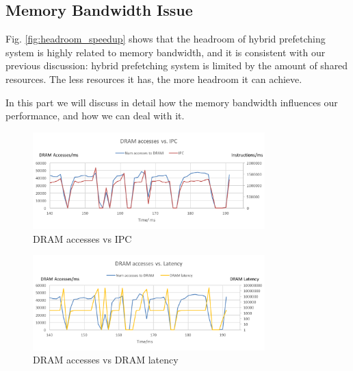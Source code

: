   \subsection{Memory Bandwidth Issue}

  \label{sec:memorybandwidthissue}
  Fig. \ref{fig:headroom_speedup} shows that the headroom of hybrid prefetching system is highly related to memory bandwidth, and it is consistent with our previous discussion: hybrid prefetching system is limited by the amount of shared resources. 
  The less resources it has, the more headroom it can achieve.\par
  In this part we will discuss in detail how the memory bandwidth influences our performance, and how we can deal with it.\par
  

    \begin{figure}[h]
	   \centering
	   \includegraphics[width=0.8\textwidth]{images/bandwidth_IPC.png}
	   \caption{DRAM accesses vs IPC}
	  \label{fig:bandwidth_IPC}
  \end{figure}
  \begin{figure}[h]
	   \centering
	   \includegraphics[width=0.8\textwidth]{images/bandwidth_latency.png}
	   \caption{DRAM accesses vs DRAM latency}
	  \label{fig:bandwidth_latency}
  \end{figure}

